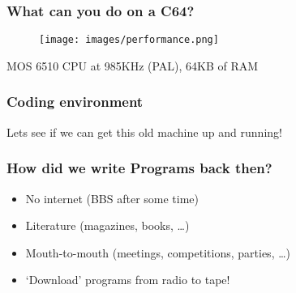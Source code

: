 \documentclass{beamer}
\begin{document}
\begin{frame}
\frametitle{What can you do on a C64?}

\begin{figure}
\texttt{[image: images/performance.png]}
\end{figure}

MOS 6510 CPU at 985KHz (PAL), 64KB of RAM

\end{frame}


{
\begin{frame}[plain]
\end{frame}
}


{
\begin{frame}[plain]
\end{frame}
}



\begin{frame}
\frametitle{Coding environment}

Lets see if we can get this old machine up and running!

\end{frame}


\begin{frame}
\frametitle{How did we write Programs back then?}

\begin{itemize}
\item No internet (BBS after some time)
\item Literature (magazines, books, \dots)
\item Mouth-to-mouth (meetings, competitions, parties, \dots)
\item `Download' programs from radio to tape!
\end{itemize}

\end{frame}

\end{document}
